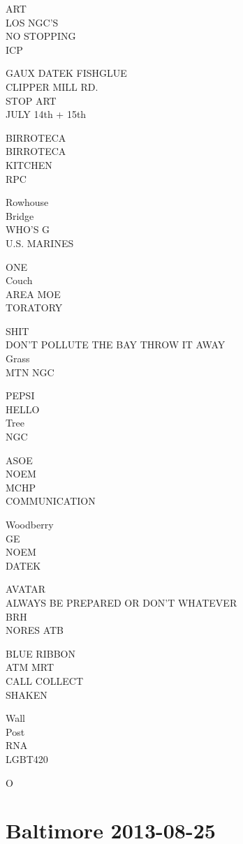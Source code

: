 \documentclass[10pt,letterpaper]{article}
\begin{document}
ART\\
LOS NGC'S\\
NO STOPPING\\
ICP

GAUX DATEK FISHGLUE\\
CLIPPER MILL RD.\\
STOP ART\\
JULY 14th + 15th

BIRROTECA\\
BIRROTECA\\
KITCHEN\\
RPC

Rowhouse\\
Bridge\\
WHO'S G\\
U.S. MARINES

ONE\\
Couch\\
AREA MOE\\
TORATORY

SHIT\\
DON'T POLLUTE THE BAY THROW IT AWAY\\
Grass\\
MTN NGC

PEPSI\\
HELLO\\
Tree\\
NGC

ASOE\\
NOEM\\
MCHP\\
COMMUNICATION

Woodberry\\
GE\\
NOEM\\
DATEK

AVATAR\\
ALWAYS BE PREPARED OR DON'T WHATEVER\\
BRH\\
NORES ATB

BLUE RIBBON\\
ATM MRT\\
CALL COLLECT\\
SHAKEN

Wall\\
Post\\
RNA\\
LGBT420

O


\section*{Baltimore 2013-08-25}
\end{document}
